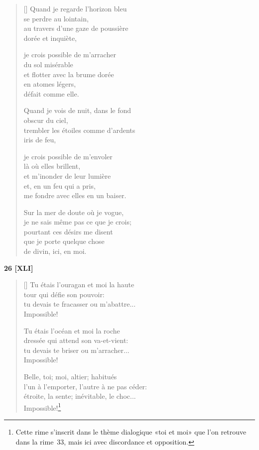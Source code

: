 \documentclass[a4paper,12pt]{book}
\begin{document}
\begin{verse}[\versewidth]
  Quand je regarde l'horizon bleu \\
  se perdre au lointain, \\
  au travers d'une gaze de poussière \\
  dorée et inquiète,

  je crois possible de m'arracher \\
  du sol misérable \\
  et flotter avec la brume dorée \\
  en atomes légers, \\
  défait comme elle.

  Quand je vois de nuit, dans le fond \\
  obscur du ciel, \\
  trembler les étoiles comme d'ardents \\
  iris de feu,

  je crois possible de m'envoler \\
  là où elles brillent, \\
  et m'inonder de leur lumière \\
  et, en un feu qui a pris, \\
  me fondre avec elles en un baiser.

  Sur la mer de doute où je vogue, \\
  je ne sais même pas ce que je crois; \\
  pourtant ces désirs me disent \\
  que je porte quelque chose \\
  de divin, ici, en moi.
\end{verse}

\bigskip

\begin{center}
  \textbf{26 [XLI]}
\end{center}

\settowidth{\versewidth}{l'un à l'emporter, l'autre à ne pas céder;}

\begin{verse}[\versewidth]
  Tu étais l'ouragan et moi la haute \\
  tour qui défie son pouvoir: \\
  tu devais te fracasser ou m'abattre... \\
  Impossible!

  Tu étais l'océan et moi la roche \\
  dressée qui attend son va-et-vient: \\
  tu devais te briser ou m'arracher... \\
  Impossible!

  Belle, toi; moi, altier; habitués \\
  l'un à l'emporter, l'autre à ne pas céder: \\
  étroite, la sente; inévitable, le choc... \\
  Impossible!\footnote{Cette rime s'inscrit dans le thème dialogique
  «toi et moi» que l'on retrouve dans la rime~33, mais ici avec
  discordance et opposition.}
\end{verse}
\end{document}
